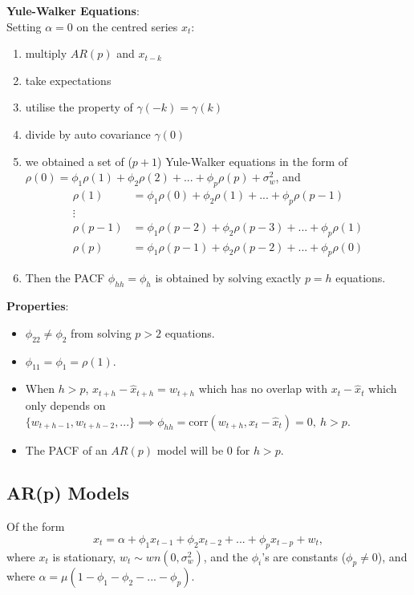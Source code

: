 \documentclass[11pt]{article}
\newcommand{\noi}{\noindent}
\begin{document}
\noi \textbf{Yule-Walker Equations}: \\
\noi Setting $\alpha = 0$ on the centred series $x_t$:
\begin{enumerate}
    \item multiply $AR(p)$ and $x_{t-k}$
    \item take expectations
    \item utilise the property of $\gamma(-k) = \gamma(k)$
    \item divide by auto covariance $\gamma(0)$
    \item we obtained a set of ($p+1$) Yule-Walker equations in the form of $\rho(0) = \phi_1\rho(1) + \phi_2\rho(2) + ... + \phi_p \rho(p) + \sigma_w^2$, and \begin{align*}
        \rho(1) &= \phi_1 \rho(0) + \phi_2 \rho(1) + ... + \phi_{p}\rho(p-1) \\
        \vdots& \\
        \rho(p-1) &= \phi_1\rho(p-2) + \phi_2 \rho(p-3) + ... + \phi_p \rho(1) \\
        \rho(p) &= \phi_1 \rho(p-1) + \phi_2 \rho(p-2) + ... + \phi_p \rho(0)
    \end{align*}
    \item Then the PACF $\phi_{hh} = \phi_h$ is obtained by solving exactly $p=h$ equations.
\end{enumerate} \phantom{i}

\noi \textbf{Properties}:
\begin{itemize}
    \item $\phi_{22} \neq \phi_2$ from solving $p > 2$ equations.
    \item $\phi_{11} = \phi_1 = \rho(1)$.
    \item When $h > p$, $x_{t+h} - \hat{x}_{t+h} = w_{t+h}$ which has no overlap with $x_{t} - \hat{x}_t$ which only depends on $\{w_{t+h-1}, w_{t+h-2},...\} \implies \phi_{hh} = \text{corr}(w_{t+h}, x_t - \hat{x}_t) = 0, \: h> p$.
    \item The PACF of an $AR(p)$ model will be $0$ for $h > p$.
\end{itemize}

\subsection{AR(p) Models}
\noi Of the form
$$x_t = \alpha + \phi_1x_{t-1} + \phi_2x_{t-2} + ... + \phi_px_{t-p} + w_t,$$
\noi where $x_t$ is stationary, $w_t \sim wn(0, \sigma_w^2)$, and the $\phi_i$'s are constants ($\phi_p \neq 0$), and where $\alpha = \mu(1 - \phi_1 - \phi_2 - ... - \phi_p)$. \\
\end{document}
